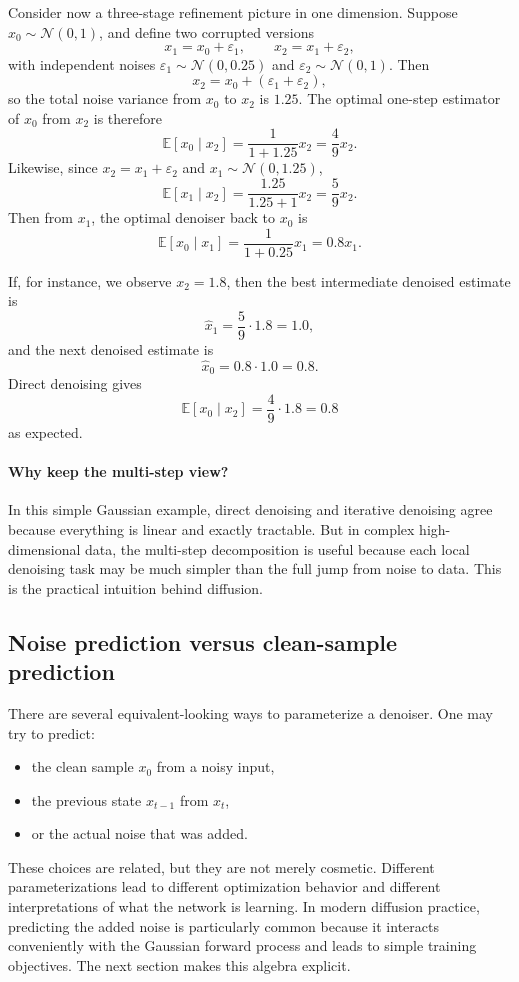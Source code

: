 Consider now a three-stage refinement picture in one dimension.
Suppose $x_0\sim \mathcal{N}(0,1)$, and define two corrupted versions
\[
x_1 = x_0 + \varepsilon_1,
\qquad
x_2 = x_1 + \varepsilon_2,
\]
with independent noises $\varepsilon_1\sim \mathcal{N}(0,0.25)$ and $\varepsilon_2\sim \mathcal{N}(0,1)$.
Then
\[
x_2 = x_0 + (\varepsilon_1+\varepsilon_2),
\]
so the total noise variance from $x_0$ to $x_2$ is $1.25$.
The optimal one-step estimator of $x_0$ from $x_2$ is therefore
\[
\mathbb{E}[x_0\mid x_2]
=
\frac{1}{1+1.25}x_2
=\frac{4}{9}x_2.
\]
Likewise, since $x_2=x_1+\varepsilon_2$ and $x_1\sim \mathcal{N}(0,1.25)$,
\[
\mathbb{E}[x_1\mid x_2]
=
\frac{1.25}{1.25+1}x_2
=\frac{5}{9}x_2.
\]
Then from $x_1$, the optimal denoiser back to $x_0$ is
\[
\mathbb{E}[x_0\mid x_1]
=
\frac{1}{1+0.25}x_1
=0.8x_1.
\]

If, for instance, we observe $x_2=1.8$, then the best intermediate denoised estimate is
\[
\hat x_1=\frac{5}{9}\cdot 1.8 = 1.0,
\]
and the next denoised estimate is
\[
\hat x_0=0.8\cdot 1.0=0.8.
\]
Direct denoising gives
\[
\mathbb{E}[x_0\mid x_2]=\frac{4}{9}\cdot 1.8 = 0.8
\]
as expected.

\paragraph{Why keep the multi-step view?}
In this simple Gaussian example, direct denoising and iterative denoising agree because everything is linear and exactly tractable.
But in complex high-dimensional data, the multi-step decomposition is useful because each local denoising task may be much simpler than the full jump from noise to data.
This is the practical intuition behind diffusion.

\subsection*{Noise prediction versus clean-sample prediction}

There are several equivalent-looking ways to parameterize a denoiser.
One may try to predict:
\begin{itemize}
    \item the clean sample $x_0$ from a noisy input,
    \item the previous state $x_{t-1}$ from $x_t$,
    \item or the actual noise that was added.
\end{itemize}

These choices are related, but they are not merely cosmetic.
Different parameterizations lead to different optimization behavior and different interpretations of what the network is learning.
In modern diffusion practice, predicting the added noise is particularly common because it interacts conveniently with the Gaussian forward process and leads to simple training objectives.
The next section makes this algebra explicit.

